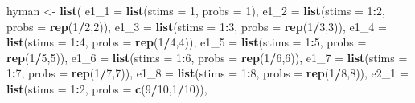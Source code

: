 \documentclass[,man,floatsintext]{apa6}
\newenvironment{Shaded}{\begin{snugshade}}{\end{snugshade}}
\newcommand{\DataTypeTok}[1]{\textcolor[rgb]{0.13,0.29,0.53}{#1}}
\newcommand{\DecValTok}[1]{\textcolor[rgb]{0.00,0.00,0.81}{#1}}
\newcommand{\KeywordTok}[1]{\textcolor[rgb]{0.13,0.29,0.53}{\textbf{#1}}}
\newcommand{\NormalTok}[1]{#1}
\newcommand{\OperatorTok}[1]{\textcolor[rgb]{0.81,0.36,0.00}{\textbf{#1}}}
\newcommand{\StringTok}[1]{\textcolor[rgb]{0.31,0.60,0.02}{#1}}
\begin{document}
\begin{Shaded}
\begin{Highlighting}[]
\NormalTok{hyman <-}\StringTok{ }\KeywordTok{list}\NormalTok{(}
  \DataTypeTok{e1_1 =} \KeywordTok{list}\NormalTok{(}\DataTypeTok{stims =} \DecValTok{1}\NormalTok{,}
              \DataTypeTok{probs =} \DecValTok{1}\NormalTok{),}
  \DataTypeTok{e1_2 =} \KeywordTok{list}\NormalTok{(}\DataTypeTok{stims =} \DecValTok{1}\OperatorTok{:}\DecValTok{2}\NormalTok{,}
              \DataTypeTok{probs =} \KeywordTok{rep}\NormalTok{(}\DecValTok{1}\OperatorTok{/}\DecValTok{2}\NormalTok{,}\DecValTok{2}\NormalTok{)),}
  \DataTypeTok{e1_3 =} \KeywordTok{list}\NormalTok{(}\DataTypeTok{stims =} \DecValTok{1}\OperatorTok{:}\DecValTok{3}\NormalTok{,}
              \DataTypeTok{probs =} \KeywordTok{rep}\NormalTok{(}\DecValTok{1}\OperatorTok{/}\DecValTok{3}\NormalTok{,}\DecValTok{3}\NormalTok{)),}
  \DataTypeTok{e1_4 =} \KeywordTok{list}\NormalTok{(}\DataTypeTok{stims =} \DecValTok{1}\OperatorTok{:}\DecValTok{4}\NormalTok{,}
              \DataTypeTok{probs =} \KeywordTok{rep}\NormalTok{(}\DecValTok{1}\OperatorTok{/}\DecValTok{4}\NormalTok{,}\DecValTok{4}\NormalTok{)),}
  \DataTypeTok{e1_5 =} \KeywordTok{list}\NormalTok{(}\DataTypeTok{stims =} \DecValTok{1}\OperatorTok{:}\DecValTok{5}\NormalTok{,}
              \DataTypeTok{probs =} \KeywordTok{rep}\NormalTok{(}\DecValTok{1}\OperatorTok{/}\DecValTok{5}\NormalTok{,}\DecValTok{5}\NormalTok{)),}
  \DataTypeTok{e1_6 =} \KeywordTok{list}\NormalTok{(}\DataTypeTok{stims =} \DecValTok{1}\OperatorTok{:}\DecValTok{6}\NormalTok{,}
              \DataTypeTok{probs =} \KeywordTok{rep}\NormalTok{(}\DecValTok{1}\OperatorTok{/}\DecValTok{6}\NormalTok{,}\DecValTok{6}\NormalTok{)),}
  \DataTypeTok{e1_7 =} \KeywordTok{list}\NormalTok{(}\DataTypeTok{stims =} \DecValTok{1}\OperatorTok{:}\DecValTok{7}\NormalTok{,}
              \DataTypeTok{probs =} \KeywordTok{rep}\NormalTok{(}\DecValTok{1}\OperatorTok{/}\DecValTok{7}\NormalTok{,}\DecValTok{7}\NormalTok{)),}
  \DataTypeTok{e1_8 =} \KeywordTok{list}\NormalTok{(}\DataTypeTok{stims =} \DecValTok{1}\OperatorTok{:}\DecValTok{8}\NormalTok{,}
              \DataTypeTok{probs =} \KeywordTok{rep}\NormalTok{(}\DecValTok{1}\OperatorTok{/}\DecValTok{8}\NormalTok{,}\DecValTok{8}\NormalTok{)),}
  \DataTypeTok{e2_1 =} \KeywordTok{list}\NormalTok{(}\DataTypeTok{stims =} \DecValTok{1}\OperatorTok{:}\DecValTok{2}\NormalTok{,}
              \DataTypeTok{probs =} \KeywordTok{c}\NormalTok{(}\DecValTok{9}\OperatorTok{/}\DecValTok{10}\NormalTok{,}\DecValTok{1}\OperatorTok{/}\DecValTok{10}\NormalTok{)),}

\end{Highlighting}
\end{Shaded}
\end{document}
